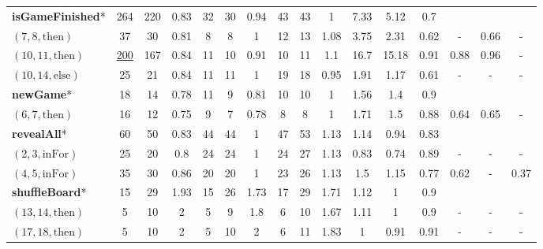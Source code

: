 \documentclass[sigconf,review]{acmart}
\newcommand{\thenBr}{\text{then}}
\newcommand{\elseBr}{\text{else}}
\newcommand{\inFor}{\text{inFor}}
\newcommand{\un}[1]{\underline{#1}}
\begin{document}
\begin{table}[!t]
\begin{tabular}{l|ccc|ccc|ccc|ccc|ccc}
    \hline                                                                                                          
    \textbf{isGameFinished}* & 264      & 220  & 0.83      & 32 & 30 & 0.94             & 43 & 43 & 1                  & 7.33 & 5.12  & 0.7    &      &      &        \\
    $(7,8,\thenBr)$          & 37       & 30   & 0.81      & 8  & 8  & 1                & 12 & 13 & 1.08               & 3.75 & 2.31  & 0.62   & -  & 0.66 & -   \\
    $(10,11,\thenBr)$        & \un{200} & 167  & 0.84      & 11 & 10 & 0.91             & 10 & 11 & 1.1                & 16.7 & 15.18 & 0.91   & 0.88 & 0.96 & -   \\
    $(10,14,\elseBr)$        & 25       & 21   & 0.84      & 11 & 11 & 1                & 19 & 18 & 0.95               & 1.91 & 1.17  & 0.61   & - & - & -   \\
    \hline
    \textbf{newGame}*   
                             & 18       & 14   & 0.78      & 11 & 9  & 0.81             & 10 & 10 & 1                  & 1.56 & 1.4   & 0.9    &      &      &      \\
    $(6,7,\thenBr)$          & 16       & 12   & 0.75      & 9  & 7  & 0.78             & 8  & 8  & 1                  & 1.71 & 1.5   & 0.88   & 0.64 & 0.65 & -  \\
    \hline
    \textbf{revealAll}*  
                             & 60       & 50   & 0.83      & 44 & 44 & 1                & 47 & 53 & 1.13               & 1.14 & 0.94  & 0.83   &      &      &        \\
    $(2,3,\inFor)$           & 25       & 20   & 0.8       & 24 & 24 & 1                & 24 & 27 & 1.13               & 0.83 & 0.74  & 0.89   & - & - & -  \\
    $(4,5,\inFor)$           & 35       & 30   & 0.86      & 20 & 20 & 1                & 23 & 26 & 1.13               & 1.5  & 1.15  & 0.77   & 0.62 & -   &  0.37  \\
    \hline
    \textbf{shuffleBoard}*   
                             & 15       & 29   & 1.93      & 15 & 26 & 1.73             & 17 & 29 & 1.71               & 1.12 & 1     & 0.9    &      &      &       \\
    $(13,14,\thenBr)$        & 5        & 10   & 2         & 5  & 9  & 1.8              & 6  & 10 & 1.67               & 1.11 & 1     & 0.9    & - & - & -  \\
    $(17,18,\thenBr)$        & 5        & 10   & 2         & 5  & 10 & 2                & 6  & 11 & 1.83               & 1    & 0.91  & 0.91   & - & - & -   \\

\end{tabular}
\end{table}
\end{document}
